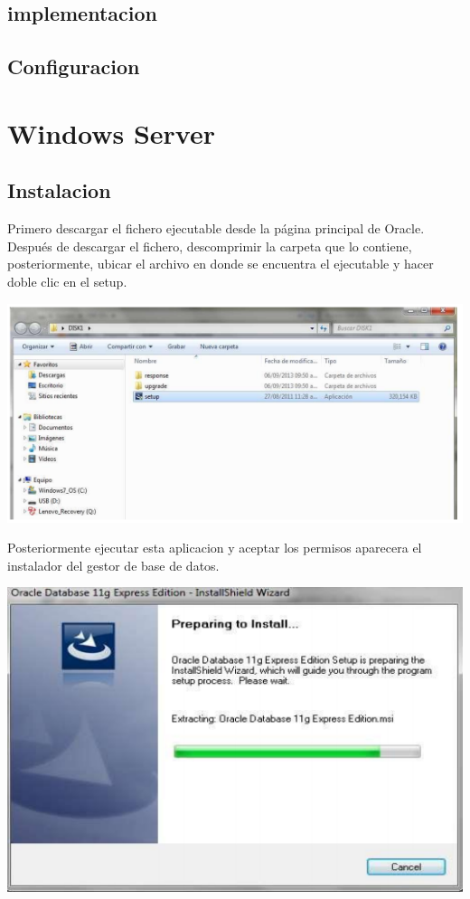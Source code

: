 \documentclass[12pt,letterpaper]{article}
\begin{document}
\subsection{implementacion}

\subsection{Configuracion}


\newpage

\section{Windows Server}
\subsection{Instalacion}
Primero descargar el fichero ejecutable desde la página principal de Oracle.
Después de descargar el fichero, descomprimir la carpeta que lo contiene,
posteriormente, ubicar el archivo en donde se encuentra el ejecutable y
hacer doble clic en el setup.
\begin{center}
\includegraphics[width=15cm]{./IMG/img1}
\end{center} 
Posteriormente ejecutar esta aplicacion y aceptar los permisos aparecera el
instalador del gestor de base de datos.
\begin{center}
\includegraphics[width=15cm]{./IMG/img2}
\end{center} 
\end{document}
